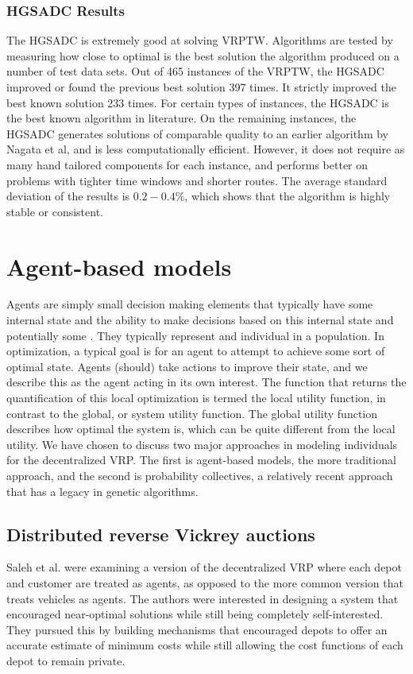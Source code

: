 \documentclass{sig-alternate}
\begin{document}
\subsubsection{HGSADC Results} 
 The HGSADC is extremely good at solving VRPTW. Algorithms are tested by measuring how close to optimal is the best solution the algorithm produced on a number of test data sets. Out of 465 instances of the VRPTW, the HGSADC improved or found the previous best solution 397 times. It strictly improved the best known solution 233 times. For certain types of instances, the HGSADC is the best known algorithm in literature. On the remaining instances, the HGSADC generates solutions of comparable quality to an earlier algorithm by Nagata et al, and is less computationally efficient. However, it does not require as many hand tailored components for each instance, and performs better on problems with tighter time windows and shorter routes. The average standard deviation of the results is $0.2-0.4\%$, which shows that the algorithm is highly stable or consistent. 
  
\section{Agent-based models}
Agents are simply small decision making elements that typically have some internal state and the ability to make decisions based on this internal state and potentially some . They typically represent and individual in a population. In optimization, a typical goal is for an agent to attempt to achieve some sort of optimal state. Agents (should) take actions to improve their state, and we describe this as the agent acting in its own interest. The function that returns the quantification of this local optimization is termed the local utility function, in contrast to the global, or system utility function. The global utility function describes how optimal the system is, which can be quite different from the local utility.
We have chosen to discuss two major approaches in modeling individuals for the decentralized VRP. The first is agent-based models, the more traditional approach, and the second is probability collectives, a relatively recent approach that has a legacy in genetic algorithms.

\subsection{Distributed reverse Vickrey auctions}

Saleh et al. \cite{Saleh:2012} were examining a version of the decentralized VRP where each depot and customer are treated as agents, as opposed to the more common version that treats vehicles as agents. The authors were interested in designing a system that encouraged near-optimal solutions while still being completely self-interested. They pursued this by building mechanisms that encouraged depots to offer an accurate estimate of minimum costs while still allowing the cost functions of each depot to remain private. 
\end{document}
